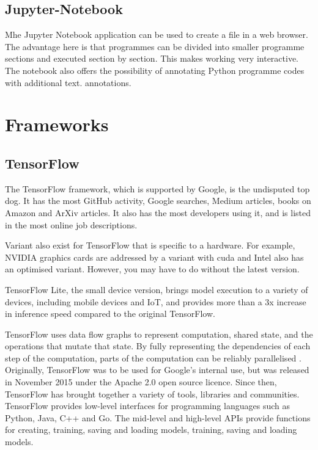 \subsection{Jupyter-Notebook}

Mhe Jupyter Notebook application can be used to create a file in a web browser. The advantage here is that programmes can be divided into smaller programme sections and executed section by section. This makes working very interactive. The notebook also offers the possibility of annotating Python programme codes with additional text.
annotations. \cite{Buxmann:2019}




\section{Frameworks}







\subsection{TensorFlow}


The TensorFlow framework, which is supported by Google, is the undisputed top dog. It has the most GitHub activity, Google searches, Medium articles, books on Amazon and ArXiv articles. It also has the most developers using it, and is listed in the most online job descriptions. \cite{GoogleTensorFlow:2019}

Variant also exist for TensorFlow that is specific to a hardware. For example, NVIDIA graphics cards are addressed by a variant with \ac{cuda} and Intel also has an optimised variant. However, you may have to do without the latest version.

TensorFlow Lite, the small device version, brings model execution to a variety of devices, including mobile devices and IoT, and provides more than a 3x increase in inference speed compared to the original TensorFlow. 

TensorFlow uses data flow graphs to represent computation, shared state, and the operations that mutate that state. By fully representing the dependencies of each step of the computation, parts of the computation can be reliably parallelised \cite{Abadi:2016}. 
Originally, TensorFlow was to be used for Google's internal use, but was
released in November 2015 under the Apache 2.0 open source licence.
Since then, TensorFlow has brought together a variety of tools, libraries and communities.
TensorFlow provides low-level interfaces for programming languages such as Python, Java,
C++ and Go. The mid-level and high-level APIs provide functions for creating, training, saving and loading models,
training, saving and loading models. \cite{Chollet:2018} %

